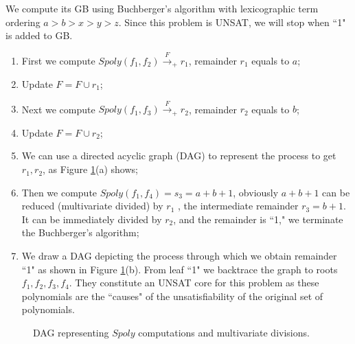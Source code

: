 \begin{Example}
\vspace{0.1in}
We compute its GB using Buchberger's algorithm with lexicographic term ordering $a>b>x>y>z$.
Since this problem is UNSAT, we will stop when ``1" is added to GB.
\begin{enumerate}[{1)}]
\item First we compute $Spoly(f_1,f_2)\xrightarrow{F}_{+} r_1$, remainder $r_1$ equals to $a$;
\item Update $F=F\cup r_1$;
\item Next we compute $Spoly(f_1,f_3)\xrightarrow{F}_{+} r_2$, remainder $r_2$ equals to $b$;
\item Update $F=F\cup r_2$;
\item We can use a directed acyclic graph (DAG) to represent the process to get $r_1,r_2$, as Figure \ref{fig:originUNSAT}(a) shows;
\item Then we compute $Spoly(f_1,f_4) = s_3= a+b+1$, obviously $a+b+1$ can be reduced (multivariate divided) by
$r_1$ , the intermediate remainder $r_3 = b+1$. It can be immediately divided by $r_2$, and the remainder is ``1," we
terminate the Buchberger's algorithm;
\item We draw a DAG depicting the process through which we obtain remainder ``1" as shown in Figure \ref{fig:originUNSAT}(b). 
From leaf ``1" we backtrace the graph to roots $f_1,f_2,f_3,f_4$. They constitute an UNSAT core for this problem
as these polynomials are the ``causes" of the unsatisfiability of the original set of polynomials.
\end{enumerate}
\end{Example}

\begin{figure}[tbp]
\caption{DAG representing $Spoly$ computations and multivariate divisions.}
\label{fig:originUNSAT}
\end{figure}

